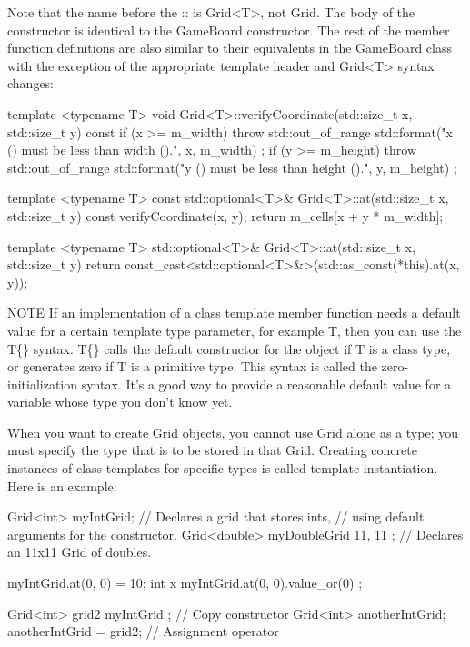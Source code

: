 Note that the name before the :: is Grid<T>, not Grid. The body of the constructor is identical to the GameBoard constructor. The rest of the member function definitions are also similar to their equivalents in the GameBoard class with the exception of the appropriate template header and Grid<T> syntax changes:

\begin{cpp}
template <typename T>
void Grid<T>::verifyCoordinate(std::size_t x, std::size_t y) const
{
    if (x >= m_width) {
        throw std::out_of_range {
            std::format("x ({}) must be less than width ({}).", x, m_width) };
    }
    if (y >= m_height) {
        throw std::out_of_range {
            std::format("y ({}) must be less than height ({}).", y, m_height) };
    }
}

template <typename T>
const std::optional<T>& Grid<T>::at(std::size_t x, std::size_t y) const
{
    verifyCoordinate(x, y);
    return m_cells[x + y * m_width];
}

template <typename T>
std::optional<T>& Grid<T>::at(std::size_t x, std::size_t y)
{
    return const_cast<std::optional<T>&>(std::as_const(*this).at(x, y));
}
\end{cpp}

\begin{myNotic}{NOTE}
If an implementation of a class template member function needs a default value for a certain template type parameter, for example T, then you can use the T\{\} syntax. T\{\} calls the default constructor for the object if T is a class type, or generates zero if T is a primitive type. This syntax is called the zero-initialization syntax. It’s a good way to provide a reasonable default value for a variable whose type you don’t know yet.
\end{myNotic}


When you want to create Grid objects, you cannot use Grid alone as a type; you must specify the type that is to be stored in that Grid. Creating concrete instances of class templates for specific types is called template instantiation. Here is an example:

\begin{cpp}
Grid<int> myIntGrid; // Declares a grid that stores ints,
// using default arguments for the constructor.
Grid<double> myDoubleGrid { 11, 11 }; // Declares an 11x11 Grid of doubles.

myIntGrid.at(0, 0) = 10;
int x { myIntGrid.at(0, 0).value_or(0) };

Grid<int> grid2 { myIntGrid }; // Copy constructor
Grid<int> anotherIntGrid;
anotherIntGrid = grid2; // Assignment operator
\end{cpp}

